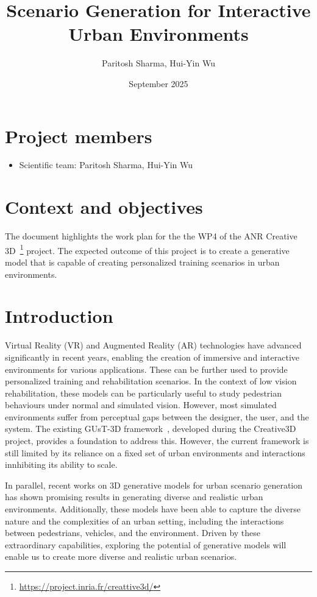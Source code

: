 \documentclass{article}
\title{Scenario Generation for Interactive Urban Environments}
\author{Paritosh Sharma, Hui-Yin Wu}
\date{September 2025}
\begin{document}
\maketitle

\section*{Project members}

\begin{itemize}
    \item Scientific team: Paritosh Sharma, Hui-Yin Wu
\end{itemize}

\section{Context and objectives}

The document highlights the work plan for the the WP4 of the ANR Creative 3D~\footnote{\url{https://project.inria.fr/creattive3d/}} project. The expected outcome of this project is to create a generative model that is capable of creating personalized training scenarios in urban environments.

\section{Introduction}

Virtual Reality (VR) and Augmented Reality (AR) technologies have advanced significantly in recent years, enabling the creation of immersive and interactive environments for various applications. These can be further used to provide personalized training and rehabilitation scenarios. In the context of low vision rehabilitation, these models can be particularly useful to study pedestrian behaviours under normal and simulated vision. However, most simulated environments suffer from perceptual gaps between the designer, the user, and the system. The existing GUsT-3D framework~\cite{wu2022designing}, developed during the Creative3D project, provides a foundation to address this. However, the current framework is still limited by its reliance on a fixed set of urban environments and interactions innhibiting its ability to scale.

In parallel, recent works on 3D generative models for urban scenario generation has shown promising results in generating diverse and realistic urban environments. Additionally, these models have been able to capture the diverse nature and the complexities of an urban setting, including the interactions between pedestrians, vehicles, and the environment. Driven by these extraordinary capabilities, exploring the potential of generative models will enable us to create more diverse and realistic urban scenarios.
\end{document}
